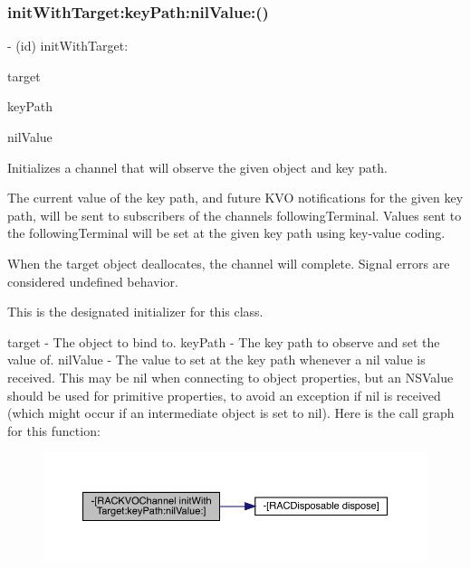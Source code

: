 \subsubsection{\texorpdfstring{init\+With\+Target\+:key\+Path\+:nil\+Value\+:()}{initWithTarget:keyPath:nilValue:()}\hspace{0.1cm}{\footnotesize\ttfamily [1/3]}}
{\footnotesize\ttfamily -\/ (id) init\+With\+Target\+: \begin{DoxyParamCaption}\item[{(\+\_\+\+\_\+weak N\+S\+Object $\ast$)}]{target }\item[{keyPath:(N\+S\+String $\ast$)}]{key\+Path }\item[{nilValue:(id)}]{nil\+Value }\end{DoxyParamCaption}}

Initializes a channel that will observe the given object and key path.

The current value of the key path, and future K\+VO notifications for the given key path, will be sent to subscribers of the channel\textquotesingle{}s {\ttfamily following\+Terminal}. Values sent to the {\ttfamily following\+Terminal} will be set at the given key path using key-\/value coding.

When the target object deallocates, the channel will complete. Signal errors are considered undefined behavior.

This is the designated initializer for this class.

target -\/ The object to bind to. key\+Path -\/ The key path to observe and set the value of. nil\+Value -\/ The value to set at the key path whenever a {\ttfamily nil} value is received. This may be nil when connecting to object properties, but an N\+S\+Value should be used for primitive properties, to avoid an exception if {\ttfamily nil} is received (which might occur if an intermediate object is set to {\ttfamily nil}). Here is the call graph for this function\+:\nopagebreak
\begin{figure}[H]
\begin{center}
\leavevmode
\includegraphics[width=350pt]{interface_r_a_c_k_v_o_channel_a4a6f2925587bdcaf90419bae2da284a4_cgraph}
\end{center}
\end{figure}
\mbox{\label{interface_r_a_c_k_v_o_channel_a4a6f2925587bdcaf90419bae2da284a4}} 
